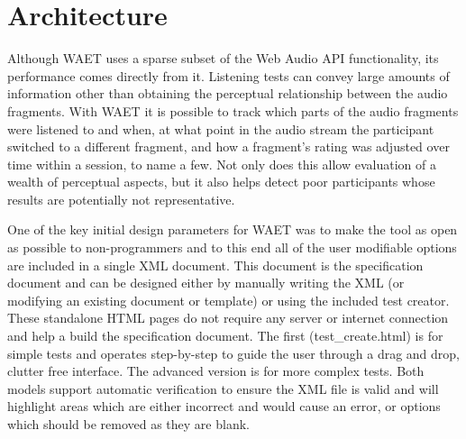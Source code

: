 \documentclass{sig-alternate}
\begin{document}
\section{Architecture}  %
\label{sec:architecture}

    Although WAET uses a sparse subset of the Web Audio API functionality, its performance comes directly from it. Listening tests can convey large amounts of information other than obtaining the perceptual relationship between the audio fragments. With WAET it is possible to track which parts of the audio fragments were listened to and when, at what point in the audio stream the participant switched to a different fragment, and how a fragment's rating was adjusted over time within a session, to name a few. Not only does this allow evaluation of a wealth of perceptual aspects, but it also helps detect poor participants whose results are potentially not representative.
    
    One of the key initial design parameters for WAET was to make the tool as open as possible to non-programmers and to this end all of the user modifiable options are included in a single XML document. This document is the specification document and can be designed either by manually writing the XML (or modifying an existing document or template) or using the included test creator. These standalone HTML pages do not require any server or internet connection and help a build the specification document. The first (test\_create.html) is for simple tests and operates step-by-step to guide the user through a drag and drop, clutter free interface. The advanced version is for more complex tests. Both models support automatic verification to ensure the XML file is valid and will highlight areas which are either incorrect and would cause an error, or options which should be removed as they are blank.
    
\end{document}
